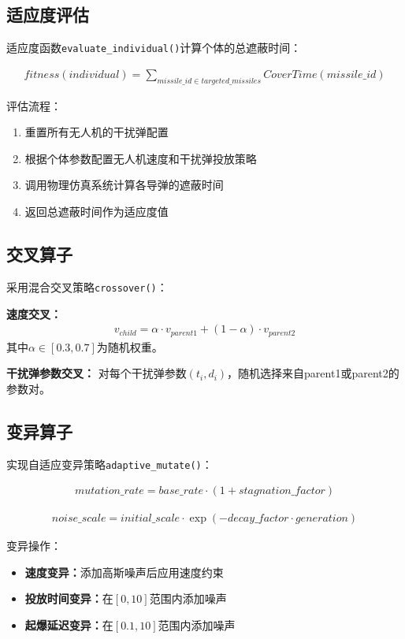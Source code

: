 \documentclass{article}
\begin{document}
\subsection{适应度评估}

适应度函数\texttt{evaluate\_individual()}计算个体的总遮蔽时间：

\begin{align}
fitness(individual) = \sum_{missile\_id \in targeted\_missiles} CoverTime(missile\_id)
\end{align}

评估流程：
\begin{enumerate}
    \item 重置所有无人机的干扰弹配置
    \item 根据个体参数配置无人机速度和干扰弹投放策略
    \item 调用物理仿真系统计算各导弹的遮蔽时间
    \item 返回总遮蔽时间作为适应度值
\end{enumerate}

\subsection{交叉算子}

采用混合交叉策略\texttt{crossover()}：

\textbf{速度交叉：}
\begin{align}
v_{child} = \alpha \cdot v_{parent1} + (1-\alpha) \cdot v_{parent2}
\end{align}
其中$\alpha \in [0.3, 0.7]$为随机权重。

\textbf{干扰弹参数交叉：}
对每个干扰弹参数$(t_i, d_i)$，随机选择来自parent1或parent2的参数对。

\subsection{变异算子}

实现自适应变异策略\texttt{adaptive\_mutate()}：

\begin{align}
mutation\_rate = base\_rate \cdot (1 + stagnation\_factor)
\end{align}

\begin{align}
noise\_scale = initial\_scale \cdot \exp(-decay\_factor \cdot generation)
\end{align}

变异操作：
\begin{itemize}
    \item \textbf{速度变异：}添加高斯噪声后应用速度约束
    \item \textbf{投放时间变异：}在$[0, 10]$范围内添加噪声
    \item \textbf{起爆延迟变异：}在$[0.1, 10]$范围内添加噪声
\end{itemize}
\end{document}
